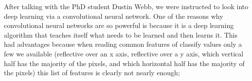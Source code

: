 \documentclass[12pt]{article}
\begin{document}
After talking with the PhD student Dustin Webb, we were instructed to look into deep learning via a convolutional neural network.  One of the reasons why convolutional neural networks are so powerful is because it is a deep learning algorithm that teaches itself what needs to be learned and then learns it.  This had advantages because when reading common features of classify values only a few we available (reflective over an x axis, reflective over a y axis, which vertical half has the majority of the pixels, and which horizontal half has the majority of the pixels) this list of features is clearly not nearly enough;



\end{document}
